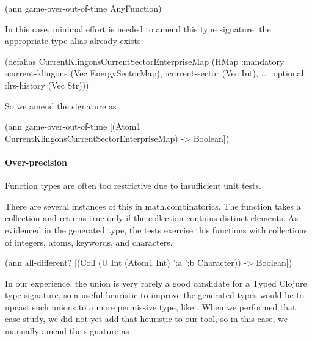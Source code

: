 \begin{cljlisting}
(ann game-over-out-of-time AnyFunction)
\end{cljlisting}

In this case, minimal effort is needed to amend this
type signature: the appropriate type alias
already exists:

\begin{cljlisting}
(defalias CurrentKlingonsCurrentSectorEnterpriseMap
  (HMap :mandatory
    {:current-klingons (Vec EnergySectorMap),
     :current-sector (Vec Int), ...}
    :optional {:lrs-history (Vec Str)}))
\end{cljlisting}

So we amend the signature as

\begin{cljlisting}
(ann game-over-out-of-time
  [(Atom1 CurrentKlingonsCurrentSectorEnterpriseMap) 
   -> Boolean])
\end{cljlisting}


\paragraph{Over-precision}
Function types are often too restrictive due to
insufficient unit tests.

There are several instances of this in math.combinatorics.
The  function
takes a collection and returns true only if the collection
contains distinct elements.
As evidenced in the generated type, the tests exercise
this functions with collections of integers, atoms,
keywords, and characters.

\begin{cljlisting}
(ann all-different?
  [(Coll (U Int (Atom1 Int) ':a ':b Character)) 
   -> Boolean])
\end{cljlisting}

In our experience, the union is very rarely a good candidate
for a Typed Clojure type signature, so a useful heuristic to improve
the generated types would be to upcast such unions to a more permissive
type, like .
When we performed that case study, we did not yet add that heuristic
to our tool,
so in this case, we manually amend the signature as

